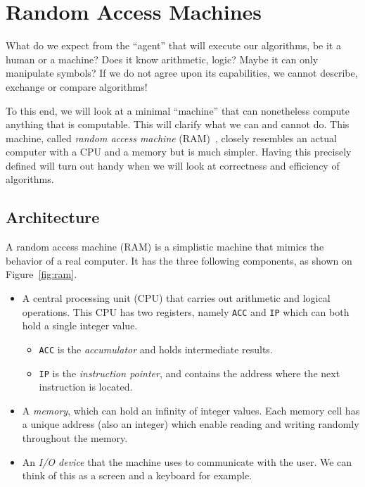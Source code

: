 \documentclass {aldast}
\begin{document}
 
\section{Random Access Machines}

What do we expect from the ``agent'' that will execute our algorithms, be
it a human or a machine? Does it know arithmetic, logic? Maybe it can
only manipulate symbols? If we do not agree upon its capabilities, we
cannot describe, exchange or compare algorithms!

To this end, we will look at a minimal ``machine'' that can
nonetheless compute anything that is computable. This will clarify
what we can and cannot do. This machine, called \emph{random access
  machine} (RAM)~\cite{cook1973}, closely resembles an actual computer
with a CPU and a memory but is much simpler. Having this precisely
defined will turn out handy when we will look at correctness and
efficiency of algorithms.

\subsection{Architecture}

A random access machine (RAM) is a simplistic machine that mimics the
behavior of a real computer. It has
the three following components, as shown on Figure~\ref{fig:ram}.
\begin{itemize}
\item A central processing unit (CPU) that carries out arithmetic and
  logical operations. This CPU has two registers, namely \texttt{ACC}
  and \texttt{IP} which can both hold a single integer value.
  \begin{itemize}
  \item \texttt{ACC} is the \emph{accumulator} and holds
    intermediate results.
  \item \texttt{IP} is the \emph{instruction pointer}, and contains the
    address where the next instruction is located.
  \end{itemize}
\item A \emph{memory}, which can hold an infinity of integer
  values. Each memory cell has a unique address (also an integer)
  which enable reading and writing randomly throughout the memory.
\item An \emph{I/O device} that the machine uses to communicate with the
  user. We can think of this as a screen and a keyboard for example.
\end{itemize}
\end{document}
